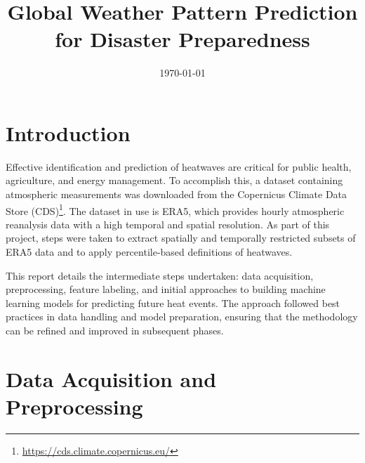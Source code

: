 \documentclass[conference,9pt]{IEEEtran}
\title{Global Weather Pattern Prediction for Disaster Preparedness}
\author{\IEEEauthorblockN{Jonas Thalmeier, Ana Martinez}}
\date{\today}
\begin{document}
\maketitle


\section{Introduction}
Effective identification and prediction of heatwaves are critical for public health, agriculture, and energy management. To accomplish this, a dataset containing atmospheric measurements was downloaded from the Copernicus Climate Data Store (CDS)\footnote{\url{https://cds.climate.copernicus.eu/}}. The dataset in use is ERA5, which provides hourly atmospheric reanalysis data with a high temporal and spatial resolution. As part of this project, steps were taken to extract spatially and temporally restricted subsets of ERA5 data and to apply percentile-based definitions of heatwaves.

This report details the intermediate steps undertaken: data acquisition, preprocessing, feature labeling, and initial approaches to building machine learning models for predicting future heat events. The approach followed best practices in data handling and model preparation, ensuring that the methodology can be refined and improved in subsequent phases.

\section{Data Acquisition and Preprocessing}
\end{document}
